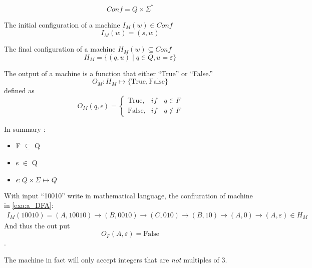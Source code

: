
\begin{definition}[Configuration]
    \[
        Conf = Q \times \Sigma^*
    \]
\end{definition}

\begin{definition}
    The initial configuration of a machine $I_M(w) \in Conf$
    \[
        I_M(w) = (s,w)
    \]
\end{definition}

\begin{definition}
    The final configuration of a machine $H_M(w) \subseteq Conf$
    \[
        H_M = \{ (q,u) \mid q \in Q, u = \varepsilon \} 
    \]
\end{definition}

\begin{definition}
The output of a machine is a function that either ``True'' or ``False.''
    \[
        O_M: H_M \mapsto \{\text {True}, \text {False}\}
    \]
    defined as
    \[
        O_M(q,\epsilon)
        = \begin{cases}
            \text{True},  & if \quad q \in F \\
            \text{False}, & if \quad q \notin F
        \end{cases}
    \]
\end{definition}

In summary $\colon$
\begin{itemize}
\item F $\subseteq$ Q
\item s $\in$ Q
\item $\epsilon: Q \times \Sigma \mapsto Q$
\end{itemize}

\begin{example} 
    With input ``10010'' write in mathematical language, the confiuration of machine in
    \autoref{exa:a_DFA}:
    \begin{align*}
        I_M(10010) 
        = (A,10010)
        \rightarrow      (B,0010)
        \rightarrow      (C,010)
        \rightarrow      (B,10)
        \rightarrow      (A,0)
        \rightarrow      (A, \varepsilon) \in H_M
    \end{align*}
    And thus the out put 
    \[
        O_F(A,\varepsilon) = \text{False}
    \].

    The machine in fact will only accept integers that are \emph{not} multiples of 3.
\end{example}


